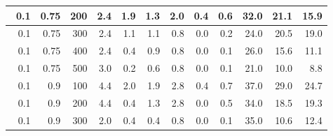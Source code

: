 \begin{longtable}{|r|r|r|r|r|r|r|r|r|r|r|r|}
    \hline \
    0.1                            & 0.75                    & 200                       & 2.4                       & 1.9                       & 1.3                       & 2.0                       & 0.4                       & 0.6                       & 32.0                      & 21.1                      & 15.9                      \\
    \hline \
    0.1                            & 0.75                    & 300                       & 2.4                       & 1.1                       & 1.1                       & 0.8                       & 0.0                       & 0.2                       & 24.0                      & 20.5                      & 19.0                       \\
    \hline \
    0.1                            & 0.75                     & 400                       & 2.4                       & 0.4                       & 0.9                       & 0.8                       & 0.0                       & 0.1                       & 26.0                      & 15.6                      & 11.1                      \\
    \hline \
    0.1                            & 0.75                     & 500                       & 3.0                       & 0.2                       & 0.6                       & 0.8                       & 0.0                       & 0.1                       & 21.0                      & 10.0                      & 8.8                      \\
    \hline \
    0.1                            & 0.9                     & 100                       & 4.4                       & 2.0                       & 1.9                       & 2.8                       & 0.4                       & 0.7                       & 37.0                      & 29.0                      & 24.7                      \\
    \hline \
    0.1                            & 0.9                     & 200                       & 4.4                       & 0.4                       & 1.3                       & 2.8                       & 0.0                       & 0.5                       & 34.0                      & 18.5                      & 19.3                       \\
    \hline \
    0.1                            & 0.9                     & 300                       & 2.0                       & 0.4                       & 0.4                       & 0.8                       & 0.0                       & 0.1                       & 35.0                      & 10.6                       & 12.4                       \\

\end{longtable}
